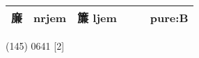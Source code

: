 \documentclass[14pt,a4paper]{scrartcl}
\begin{document}
\begin{longtable}[c]{@{}llllll@{}}
\begin{minipage}[t]{0.14\columnwidth}
廉
\strut\end{minipage} &
\begin{minipage}[t]{0.14\columnwidth}\raggedright\strut
nrjem
\strut\end{minipage} &
\begin{minipage}[t]{0.14\columnwidth}\raggedright\strut
簾 ljem
\strut\end{minipage} &
\begin{minipage}[t]{0.14\columnwidth}\raggedright\strut
\strut\end{minipage} &
\begin{minipage}[t]{0.14\columnwidth}\raggedright\strut
\strut\end{minipage} &
\begin{minipage}[t]{0.14\columnwidth}\raggedright\strut
pure:B
\strut\end{minipage}\tabularnewline
\bottomrule
\end{longtable}

(145) 0641 {[}2{]}
\end{document}
